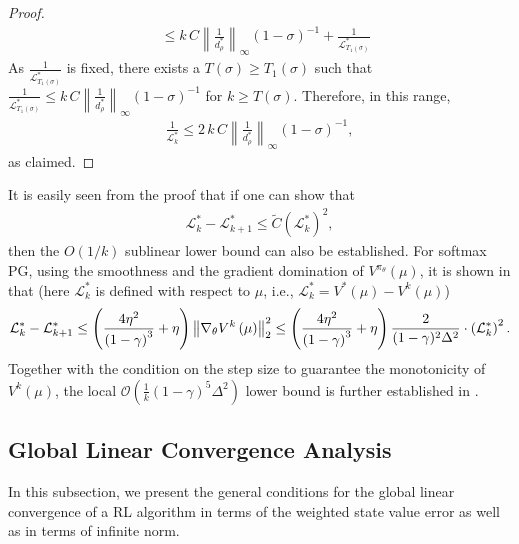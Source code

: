 \begin{proof}
\begin{align*}
&\leq k\,C\left\|\frac{1}{d_\rho^*}\right\|_\infty(1-\sigma)^{-1}+\frac{1}{\mathcal{L}_{T_1(\sigma)}^*}
\end{align*}
As $\frac{1}{\mathcal{L}_{T_1(\sigma)}^*}$ is fixed, there exists a $T(\sigma)\ge T_1(\sigma)$ such that $\frac{1}{\mathcal{L}_{T_1(\sigma)}^*}\leq k\,C\left\|\frac{1}{d_\rho^*}\right\|_\infty(1-\sigma)^{-1}$ for $k\geq T(\sigma)$. Therefore, in this range, 
\begin{align*}
\frac{1}{\mathcal{L}_k^*}\leq 2\,k\,C\left\|\frac{1}{d_\rho^*}\right\|_\infty(1-\sigma)^{-1},
\end{align*}
as claimed. 
\end{proof}
\begin{remark}
It is easily seen from the proof that if one can show that  
\begin{align*}
    \mathcal{L}_k^*-\mathcal{L}_{k+1}^*\le \tilde{C}\left(\mathcal{L}_k^*\right)^2,
\end{align*}
then the $O(1/k)$ sublinear lower bound can also be established. For softmax PG, using the smoothness and the gradient domination of $V^{\pi_\theta}(\mu)$,
it is shown in \textup{\cite{Mei_Xiao_Szepesvari_Schuurmans_2020}}   that \textup{(}here $\mathcal{L}_k^*$ is defined with respect to $\mu$, i.e., $\mathcal{L}_k^*=V^*(\mu)-V^k(\mu)$\textup{)}
$$
\mathcal{L}_k^*-\mathcal{L}_{k+1}^* \le 
\left( \frac{4\eta  ^{2}}{\left( 1-\gamma \right) ^3}+\eta  \right) \left\| \nabla _{\theta}V^{k}\left( \mu \right) \right\| _{2}^{2} \leq \left( \frac{4\eta  ^{2}}{\left( 1-\gamma \right) ^3}+\eta  \right) \frac{2}{(1-\gamma)^2 \Delta^2} \cdot \left({\cal L}_k^*\right)^2. 
$$
 {Together with the condition on the step size to guarantee the monotonicity of $V^k(\mu)$}, the local $
\mathcal{O} \left( \frac{1}{k}\left( 1-\gamma \right) ^5\Delta ^2 \right) $ lower bound is further established  in \textup{\cite{Mei_Xiao_Szepesvari_Schuurmans_2020}}.
\end{remark}
\subsection{Global Linear Convergence Analysis}
In this subsection, we present the general conditions for the global linear convergence of a RL algorithm in terms of the weighted state value error as well as  in terms of infinite norm.

